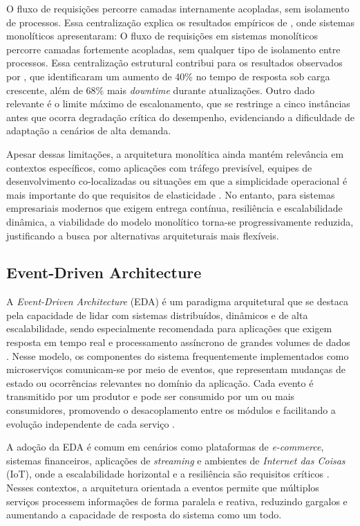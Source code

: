 O fluxo de requisições percorre camadas internamente acopladas, sem isolamento de processos. Essa centralização explica os resultados empíricos de \cite{farhan2023performance}, onde sistemas monolíticos apresentaram:
O fluxo de requisições em sistemas monolíticos percorre camadas fortemente acopladas, sem qualquer tipo de isolamento entre processos. Essa centralização estrutural contribui para os resultados observados por \cite{farhan2023performance}, que identificaram um aumento de 40\% no tempo de resposta sob carga crescente, além de 68\% mais \textit{downtime} durante atualizações. Outro dado relevante é o limite máximo de escalonamento, que se restringe a cinco instâncias antes que ocorra degradação crítica do desempenho, evidenciando a dificuldade de adaptação a cenários de alta demanda.

Apesar dessas limitações, a arquitetura monolítica ainda mantém relevância em contextos específicos, como aplicações com tráfego previsível, equipes de desenvolvimento co-localizadas ou situações em que a simplicidade operacional é mais importante do que requisitos de elasticidade \cite{shekhar2023microservices}. No entanto, para sistemas empresariais modernos que exigem entrega contínua, resiliência e escalabilidade dinâmica, a viabilidade do modelo monolítico torna-se progressivamente reduzida, justificando a busca por alternativas arquiteturais mais flexíveis.

\subsection{Event-Driven Architecture}
A \textit{Event-Driven Architecture} (EDA) é um paradigma arquitetural que se destaca pela capacidade de lidar com sistemas distribuídos, dinâmicos e de alta escalabilidade, sendo especialmente recomendada para aplicações que exigem resposta em tempo real e processamento assíncrono de grandes volumes de dados \cite{jamshidi2016systematic}. Nesse modelo, os componentes do sistema frequentemente implementados como microserviços comunicam-se por meio de eventos, que representam mudanças de estado ou ocorrências relevantes no domínio da aplicação. Cada evento é transmitido por um produtor e pode ser consumido por um ou mais consumidores, promovendo o desacoplamento entre os módulos e facilitando a evolução independente de cada serviço \cite{shekhar2023microservices}.

A adoção da EDA é comum em cenários como plataformas de \textit{e-commerce}, sistemas financeiros, aplicações de \textit{streaming} e ambientes de \textit{Internet das Coisas} (IoT), onde a escalabilidade horizontal e a resiliência são requisitos críticos \cite{jamshidi2016systematic, shekhar2023microservices}. Nesses contextos, a arquitetura orientada a eventos permite que múltiplos serviços processem informações de forma paralela e reativa, reduzindo gargalos e aumentando a capacidade de resposta do sistema como um todo.

